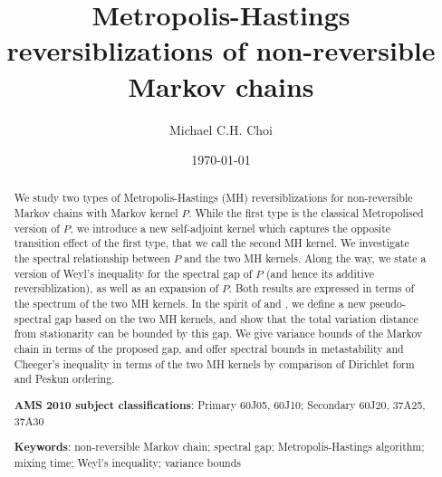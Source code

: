 \documentclass[12pt,a4]{amsart}
\numberwithin{equation}{section}
\theoremstyle{plain}
\theoremstyle{definition}
\theoremstyle{remark}
\newcommand{\1}{\mathds{1}}
\begin{document}
\title{Metropolis-Hastings reversiblizations of non-reversible Markov chains}
\author{Michael C.H. Choi}
\address{Institute for Data and Decision Analytics, The Chinese University of Hong Kong, Shenzhen, Guangdong, 518172, P.R. China.}
\date{\today}
\maketitle


\begin{abstract}
	We study two types of Metropolis-Hastings (MH) reversiblizations for non-reversible Markov chains with Markov kernel $P$. While the first type is the classical Metropolised version of $P$, we introduce a new self-adjoint kernel which captures the opposite transition effect of the first type, that we call the second MH kernel. We investigate the spectral relationship between $P$ and the two MH kernels. Along the way, we state a version of Weyl's inequality for the spectral gap of $P$ (and hence its additive reversiblization), as well as an expansion of $P$. Both results are expressed in terms of the spectrum of the two MH kernels. In the spirit of \cite{Fill91} and \cite{Paulin15}, we define a new pseudo-spectral gap based on the two MH kernels, and show that the total variation distance from stationarity can be bounded by this gap. We give variance bounds of the Markov chain in terms of the proposed gap, and offer spectral bounds in metastability and Cheeger's inequality in terms of the two MH kernels by comparison of Dirichlet form and Peskun ordering.
	\smallskip
	
	\noindent \textbf{AMS 2010 subject classifications}: Primary 60J05, 60J10; Secondary 60J20, 37A25, 37A30
	
	\noindent \textbf{Keywords}: non-reversible Markov chain; spectral gap; Metropolis-Hastings algorithm; mixing time; Weyl's inequality; variance bounds
\end{abstract}
\end{document}
